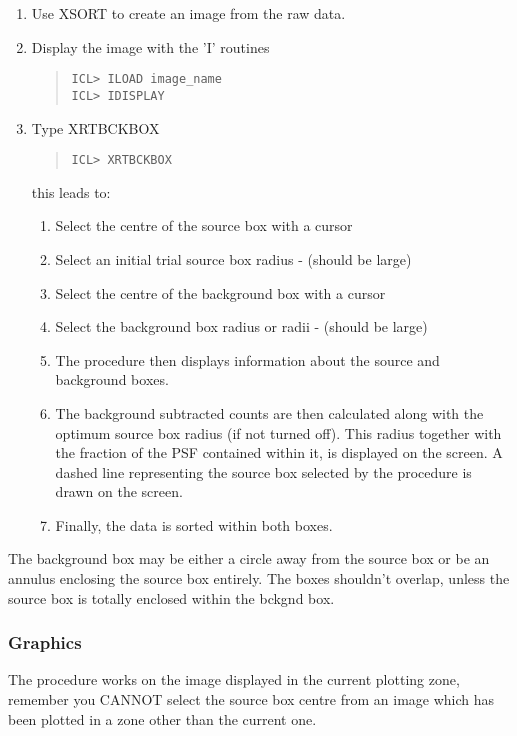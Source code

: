 \documentclass{book}
\renewcommand{\_}{{\tt\char'137}}     %
\begin{document}
\begin{enumerate}
\item Use XSORT to create an image from the raw data.
\item Display the image with the 'I' routines
\begin{quote}\begin{verbatim}
ICL> ILOAD image_name
ICL> IDISPLAY
\end{verbatim}\end{quote}
\item Type XRTBCKBOX
\begin{quote}\begin{verbatim}
ICL> XRTBCKBOX
\end{verbatim}\end{quote}
this leads to:
 
\begin{enumerate}
\item Select the centre of the source box with a cursor
\item Select an initial trial source box radius - (should be large)
\item Select the centre of the background box with a cursor
\item Select the background box radius or radii - (should be large)
\item The procedure then displays information about the source and
background boxes.
\item The background subtracted counts are then calculated along
with the optimum source box radius (if not turned off).
This radius together with the fraction of the PSF contained
within it, is displayed on the screen. A dashed line
representing the source box selected by the procedure is
drawn on the screen.
\item Finally, the data is sorted within both boxes.
\end{enumerate}
\end{enumerate}
The background box may be either a circle away from the source box or
be an annulus enclosing the source box entirely. The boxes shouldn't
overlap, unless the source box is totally enclosed within the bckgnd
box.
 
\subsubsection{Graphics}
The procedure works on the image displayed in the current plotting zone,
remember you CANNOT select the source box centre from an image which
has been plotted in a zone other than the current one.
 
\end{document}
